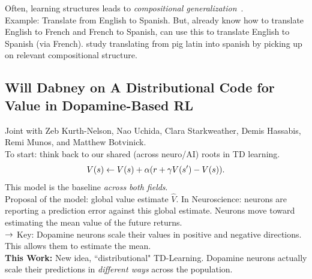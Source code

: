 Often, learning structures leads to {\it compositional generalization}~\cite{chang2018automatically}.\\ 

Example: Translate from English to Spanish. But, already know how to translate English to French and French to Spanish, can use this to translate English to Spanish (via French). \citet{chang2018automatically} study translating from pig latin into spanish by picking up on relevant compositional structure. \\



\spacerule

\subsection{Will Dabney on  A Distributional Code for Value in
Dopamine-Based RL}

Joint with Zeb Kurth-Nelson, Nao Uchida, Clara Starkweather, Demis Hassabis, Remi Munos, and Matthew Botvinick. \\

To start: think back to our shared (across neuro/AI) roots in TD learning.
\[
V(s) \leftarrow V(s) + \alpha(r + \gamma V(s') - V(s)).
\]
This model is the baseline {\it across both fields}. \\

Proposal of the model: global value estimate $\hat{V}$. In Neuroscience: neurons are reporting a prediction error against this global estimate. Neurons move toward estimating the mean value of the future returns. \\
    
    $\rightarrow$ Key: Dopamine neurons scale their values in positive and negative directions. This allows them to estimate the mean. \\


{\bf This Work:} New idea, ``distributional" TD-Learning. Dopamine neurons actually scale their predictions in {\it different ways} across the population. \\

